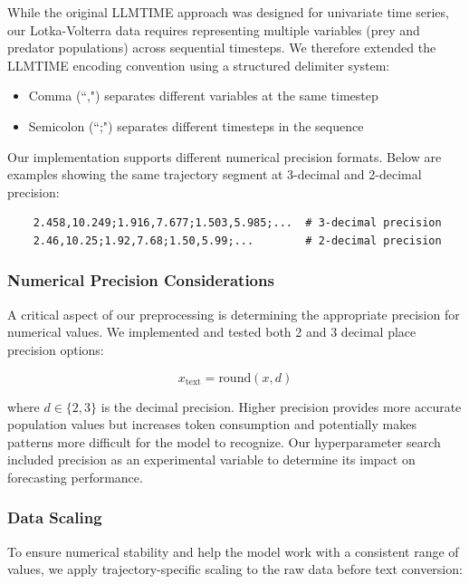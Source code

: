 \documentclass{article}
\begin{document}
While the original LLMTIME approach \cite{gruver2023large} was designed for univariate time series, our Lotka-Volterra data requires representing multiple variables (prey and predator populations) across sequential timesteps. We therefore extended the LLMTIME encoding convention using a structured delimiter system:

\begin{itemize}
    \item Comma (“,") separates different variables at the same timestep
    \item Semicolon (“;") separates different timesteps in the sequence
\end{itemize}

Our implementation supports different numerical precision formats. Below are examples showing the same trajectory segment at 3-decimal and 2-decimal precision:

\begin{verbatim}
    2.458,10.249;1.916,7.677;1.503,5.985;...  # 3-decimal precision
    2.46,10.25;1.92,7.68;1.50,5.99;...        # 2-decimal precision
\end{verbatim}



\subsubsection*{Numerical Precision Considerations}

A critical aspect of our preprocessing is determining the appropriate precision for numerical values. We implemented and tested both 2 and 3 decimal place precision options:

\begin{equation}
x_{\text{text}} = \text{round}(x, d)
\end{equation}

where $d \in \{2,3\}$ is the decimal precision. Higher precision provides more accurate population values but increases token consumption and potentially makes patterns more difficult for the model to recognize. Our hyperparameter search included precision as an experimental variable to determine its impact on forecasting performance.

\subsubsection*{Data Scaling}

To ensure numerical stability and help the model work with a consistent range of values, we apply trajectory-specific scaling to the raw data before text conversion:
\end{document}
